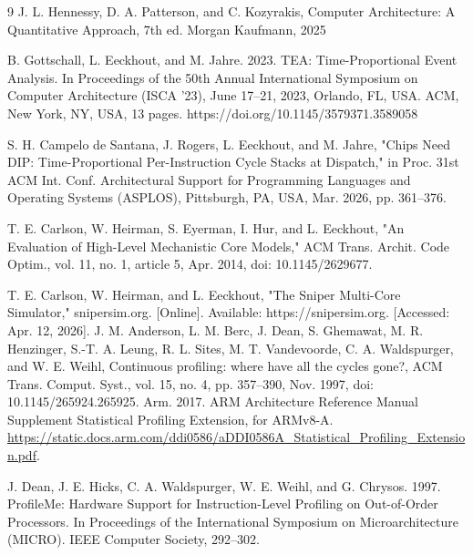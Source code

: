 \documentclass[12pt,a4paper,faculty=ea,language=nl]{ugent-doc}
\begin{document}
\renewcommand{\refname}{Referenties}
\begin{thebibliography}{9}
    J. L. Hennessy, D. A. Patterson, and C. Kozyrakis, Computer Architecture: A Quantitative Approach, 7th ed. Morgan Kaufmann, 2025

    B. Gottschall, L. Eeckhout, and M. Jahre. 2023. TEA: Time-Proportional Event Analysis. In Proceedings of the 50th Annual International Symposium on Computer Architecture (ISCA ’23), June 17–21, 2023, Orlando, FL, USA. ACM, New York, NY, USA, 13 pages. https://doi.org/10.1145/3579371.3589058

    S. H. Campelo de Santana, J. Rogers, L. Eeckhout, and M. Jahre, "Chips Need DIP: Time-Proportional Per-Instruction Cycle Stacks at Dispatch," in Proc. 31st ACM Int. Conf. Architectural Support for Programming Languages and Operating Systems (ASPLOS), Pittsburgh, PA, USA, Mar. 2026, pp. 361–376.

    T. E. Carlson, W. Heirman, S. Eyerman, I. Hur, and L. Eeckhout, "An Evaluation of High-Level Mechanistic Core Models," ACM Trans. Archit. Code Optim., vol. 11, no. 1, article 5, Apr. 2014, doi: 10.1145/2629677.

    T. E. Carlson, W. Heirman, and L. Eeckhout, "The Sniper Multi-Core Simulator," snipersim.org. [Online]. Available: https://snipersim.org. [Accessed: Apr. 12, 2026].
    J. M. Anderson, L. M. Berc, J. Dean, S. Ghemawat, M. R. Henzinger, S.-T. A. Leung, R. L. Sites, M. T. Vandevoorde, C. A. Waldspurger, and W. E. Weihl, Continuous profiling: where have all the cycles gone?, ACM Trans. Comput. Syst., vol. 15, no. 4, pp. 357--390, Nov. 1997, doi: 10.1145/265924.265925.
    Arm. 2017. ARM Architecture Reference Manual Supplement Statistical
    Profiling Extension, for ARMv8-A. \url{https://static.docs.arm.com/ddi0586/aDDI0586A_Statistical_Profiling_Extension.pdf}.

    J. Dean, J. E. Hicks, C. A. Waldspurger, W. E. Weihl, and G.
    Chrysos. 1997. ProfileMe: Hardware Support for Instruction-Level Profiling
    on Out-of-Order Processors. In Proceedings of the International Symposium on
    Microarchitecture (MICRO). IEEE Computer Society, 292–302.
\end{thebibliography}
\end{document}
